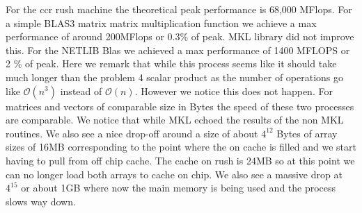 \documentclass[12pt]{article}
\theoremstyle{plain}
\theoremstyle{definition}
\begin{document}
For the ccr rush machine the theoretical peak performance is 68,000 MFlops. For a simple BLAS3 matrix matrix multiplication function we achieve a max performance of around 200MFlops or 0.3\% of peak. MKL library did not improve this. For the NETLIB Blas we achieved a max performance of 1400 MFLOPS or 2 \% of peak. Here we remark that while this process seems like it should take much longer than the problem 4 scalar product as the number of operations go like $\mathcal{O}(n^3)$ instead of $\mathcal{O}(n)$. However we notice this does not happen. For matrices and vectors of comparable size in Bytes the speed of these two processes are comparable. We notice that while MKL echoed the results of the non MKL routines. We also see a nice drop-off around a size of about $4^{12}$ Bytes of array sizes of 16MB corresponding to the point where the on cache is filled and we start having to pull from off chip cache. The cache on rush is 24MB so at this point we can no longer load both arrays to cache on chip. We also see a massive drop at $4^{15}$ or about 1GB where now the main memory is being used and the process slows way down.
\end{document}

